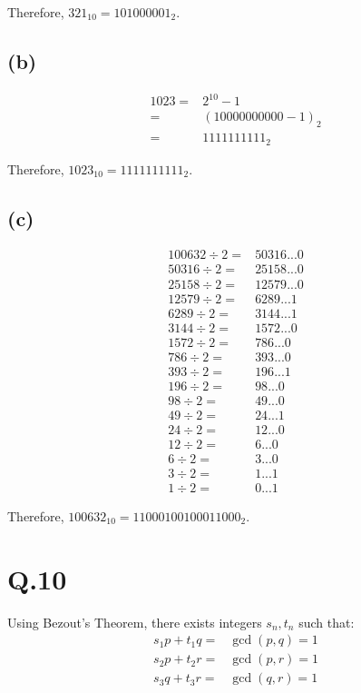 \documentclass[a4paper,12pt]{article}
\begin{document}
Therefore, $321_{10} = 101000001_2$.

\subsection*{(b)}

\begin{align*}
	1023 =& 2^{10} - 1\\
	=& (10000000000 - 1)_2\\
	=& 1111111111_2
\end{align*}

Therefore, $1023_{10} = 1111111111_2$.

\subsection*{(c)}

\begin{align*}
	100632 \div 2 =& 50316 ... 0 \\
	50316 \div 2 =& 25158 ... 0 \\
	25158 \div 2 =& 12579 ... 0 \\
	12579 \div 2 =& 6289 ... 1 \\
	6289 \div 2 =& 3144 ... 1 \\
	3144 \div 2 =& 1572 ... 0 \\
	1572 \div 2 =& 786 ... 0 \\
	786 \div 2 =& 393 ... 0 \\
	393 \div 2 =& 196 ... 1 \\
	196 \div 2 =& 98 ... 0 \\
	98 \div 2 =& 49 ... 0 \\
	49 \div 2 =& 24 ... 1 \\
	24 \div 2 =& 12 ... 0 \\
	12 \div 2 =& 6 ... 0 \\
	6 \div 2 =& 3 ... 0 \\
	3 \div 2 =& 1 ... 1 \\
	1 \div 2 =& 0 ... 1
\end{align*}

Therefore, $100632_{10} = 11000100100011000_2$.

\section*{Q.10}

Using Bezout's Theorem, there exists integers $s_n, t_n$ such that:
\begin{align*}
	s_1 p + t_1 q =& \gcd(p,q) = 1 \\
	s_2 p + t_2 r =& \gcd(p,r) = 1 \\
	s_3 q + t_3 r =& \gcd(q,r) = 1
\end{align*}
\end{document}
